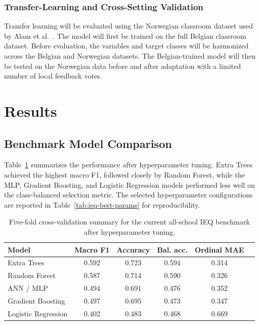 ﻿\documentclass[11pt]{article}
\newcommand{\Reviewed}[1]{\begingroup\color{black}#1\endgroup}
\begin{document}
\Reviewed{
\subsubsection{Transfer-Learning and Cross-Setting Validation}

Transfer learning will be evaluated using the Norwegian classroom dataset used by Alam et al.~\cite{alam2025schoolieq}. The model will first be trained on the full Belgian classroom dataset. Before evaluation, the variables and target classes will be harmonized across the Belgian and Norwegian datasets. The Belgian-trained model will then be tested on the Norwegian data before and after adaptation with a limited number of local feedback votes.}

\Reviewed{
\section{Results}
\subsection{Benchmark Model Comparison}

Table~\ref{tab:ieq-main-benchmark} summarizes the performance after hyperparameter tuning. Extra Trees achieved the highest macro F1, followed closely by Random Forest, while the MLP, Gradient Boosting, and Logistic Regression models performed less well on the class-balanced selection metric. The selected hyperparameter configurations are reported in Table~\ref{tab:ieq-best-params} for reproducibility.

\begin{table}[H]
    \centering
    \small
    \caption{Five-fold cross-validation summary for the current all-school IEQ benchmark after hyperparameter tuning.}
    \label{tab:ieq-main-benchmark}
    \begin{tabular}{lccccc}
        \hline
        Model & Macro F1 & Accuracy & Bal. acc. & Ordinal MAE \\
        \hline
        Extra Trees & 0.592 & 0.723 & 0.594 & 0.314 \\
        Random Forest & 0.587 & 0.714 & 0.590 & 0.326 \\
        ANN / MLP & 0.494 & 0.691 & 0.476 & 0.352 \\
        Gradient Boosting & 0.497 & 0.695 & 0.473 & 0.347 \\
        Logistic Regression & 0.402 & 0.483 & 0.468 & 0.669 \\
        \hline
    \end{tabular}
\end{table}

}
\end{document}

